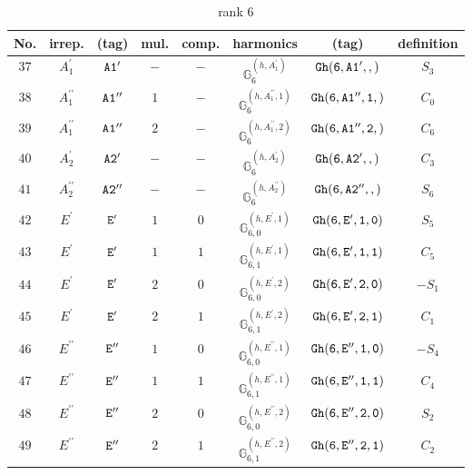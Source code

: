\documentclass[fleqn,8pt]{jsarticle}
\begin{document}
\begin{table}[ht!]
\begin{center}
\caption{rank 6}
\renewcommand{\arraystretch}{1.3}
\begin{tabular}{cccccccc} \hline \hline
No. & irrep. & (tag) & mul. & comp. & harmonics & (tag) & definition \\ \hline
$ 37 $ & $ A_{1}^{\prime} $ & $ {\tt A1'} $ & $ - $ & $ - $ & $ \mathbb{G}_{6}^{(h,A_{1}^{\prime})} $ & $ {\tt Gh(6,A1',,)} $ & $ S_{3} $ \\
$ 38 $ & $ A_{1}^{\prime\prime} $ & $ {\tt A1''} $ & $ 1 $ & $ - $ & $ \mathbb{G}_{6}^{(h,A_{1}^{\prime\prime},1)} $ & $ {\tt Gh(6,A1'',1,)} $ & $ C_{0} $ \\
$ 39 $ & $ A_{1}^{\prime\prime} $ & $ {\tt A1''} $ & $ 2 $ & $ - $ & $ \mathbb{G}_{6}^{(h,A_{1}^{\prime\prime},2)} $ & $ {\tt Gh(6,A1'',2,)} $ & $ C_{6} $ \\
$ 40 $ & $ A_{2}^{\prime} $ & $ {\tt A2'} $ & $ - $ & $ - $ & $ \mathbb{G}_{6}^{(h,A_{2}^{\prime})} $ & $ {\tt Gh(6,A2',,)} $ & $ C_{3} $ \\
$ 41 $ & $ A_{2}^{\prime\prime} $ & $ {\tt A2''} $ & $ - $ & $ - $ & $ \mathbb{G}_{6}^{(h,A_{2}^{\prime\prime})} $ & $ {\tt Gh(6,A2'',,)} $ & $ S_{6} $ \\
$ 42 $ & $ E^{\prime} $ & $ {\tt E'} $ & $ 1 $ & $ 0 $ & $ \mathbb{G}_{6,0}^{(h,E^{\prime},1)} $ & $ {\tt Gh(6,E',1,0)} $ & $ S_{5} $ \\
$ 43 $ & $ E^{\prime} $ & $ {\tt E'} $ & $ 1 $ & $ 1 $ & $ \mathbb{G}_{6,1}^{(h,E^{\prime},1)} $ & $ {\tt Gh(6,E',1,1)} $ & $ C_{5} $ \\
$ 44 $ & $ E^{\prime} $ & $ {\tt E'} $ & $ 2 $ & $ 0 $ & $ \mathbb{G}_{6,0}^{(h,E^{\prime},2)} $ & $ {\tt Gh(6,E',2,0)} $ & $ - S_{1} $ \\
$ 45 $ & $ E^{\prime} $ & $ {\tt E'} $ & $ 2 $ & $ 1 $ & $ \mathbb{G}_{6,1}^{(h,E^{\prime},2)} $ & $ {\tt Gh(6,E',2,1)} $ & $ C_{1} $ \\
$ 46 $ & $ E^{\prime\prime} $ & $ {\tt E''} $ & $ 1 $ & $ 0 $ & $ \mathbb{G}_{6,0}^{(h,E^{\prime\prime},1)} $ & $ {\tt Gh(6,E'',1,0)} $ & $ - S_{4} $ \\
$ 47 $ & $ E^{\prime\prime} $ & $ {\tt E''} $ & $ 1 $ & $ 1 $ & $ \mathbb{G}_{6,1}^{(h,E^{\prime\prime},1)} $ & $ {\tt Gh(6,E'',1,1)} $ & $ C_{4} $ \\
$ 48 $ & $ E^{\prime\prime} $ & $ {\tt E''} $ & $ 2 $ & $ 0 $ & $ \mathbb{G}_{6,0}^{(h,E^{\prime\prime},2)} $ & $ {\tt Gh(6,E'',2,0)} $ & $ S_{2} $ \\
$ 49 $ & $ E^{\prime\prime} $ & $ {\tt E''} $ & $ 2 $ & $ 1 $ & $ \mathbb{G}_{6,1}^{(h,E^{\prime\prime},2)} $ & $ {\tt Gh(6,E'',2,1)} $ & $ C_{2} $ \\
 \hline \hline
\end{tabular}
\end{center}
\end{table}
\end{document}
